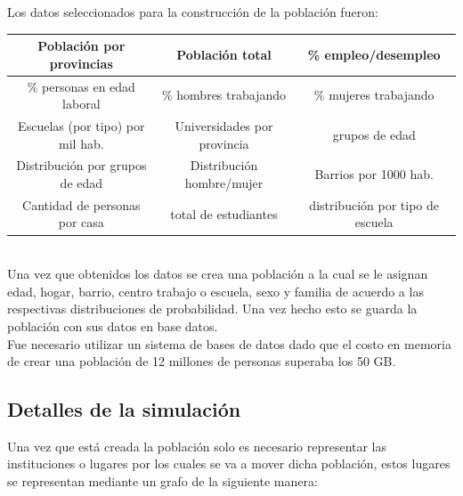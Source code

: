\documentclass{article}
\begin{document}
Los datos seleccionados para la construcción de la población fueron:\\

\begin{tabular}{*{3}{|c}|}
\hline
Población por provincias & Población total & \% empleo/desempleo \\
\hline 
\% personas en edad laboral & \% hombres trabajando & \% mujeres trabajando \\
\hline 
Escuelas (por tipo) por mil hab. & Universidades por provincia & grupos de edad \\
\hline
Distribución por grupos de edad & Distribución hombre/mujer & Barrios por 1000 hab. \\
\hline 
Cantidad de personas por casa & total de estudiantes & distribución por tipo de escuela \\
\hline
\end{tabular}\\

Una vez que obtenidos los datos se crea una población a la cual se le asignan edad, hogar, barrio, centro trabajo o escuela, sexo y familia de acuerdo a las respectivas distribuciones de probabilidad. Una vez hecho esto se guarda la población con sus datos en base datos.\\

Fue necesario utilizar un sistema de bases de datos dado que el costo en memoria de crear una población de 12 millones de personas superaba los 50 GB.

\subsection*{Detalles de la simulación } 
Una vez que está creada la poblaci\'on solo es necesario representar las instituciones o lugares por los cuales se va a mover dicha población, estos lugares se representan mediante un grafo de la siguiente manera:
\end{document}
